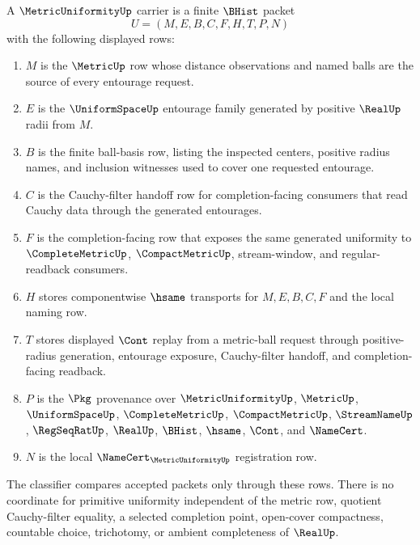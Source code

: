 \begin{definition}
\label{def:metric-uniformity-carrier}
A $\MetricUniformityUp$ carrier is a finite $\BHist$ packet
$$
U=(M,E,B,C,F,H,T,P,N)
$$
with the following displayed rows:
\begin{enumerate}
\item $M$ is the $\MetricUp$ row whose distance observations and named balls are the source of every entourage request.
\item $E$ is the $\UniformSpaceUp$ entourage family generated by positive $\RealUp$ radii from $M$.
\item $B$ is the finite ball-basis row, listing the inspected centers, positive radius names, and inclusion witnesses used to cover one requested entourage.
\item $C$ is the Cauchy-filter handoff row for completion-facing consumers that read Cauchy data through the generated entourages.
\item $F$ is the completion-facing row that exposes the same generated uniformity to $\CompleteMetricUp$, $\CompactMetricUp$, stream-window, and regular-readback consumers.
\item $H$ stores componentwise $\hsame$ transports for $M,E,B,C,F$ and the local naming row.
\item $T$ stores displayed $\Cont$ replay from a metric-ball request through positive-radius generation, entourage exposure, Cauchy-filter handoff, and completion-facing readback.
\item $P$ is the $\Pkg$ provenance over $\MetricUniformityUp$, $\MetricUp$, $\UniformSpaceUp$, $\CompleteMetricUp$, $\CompactMetricUp$, $\StreamNameUp$, $\RegSeqRatUp$, $\RealUp$, $\BHist$, $\hsame$, $\Cont$, and $\NameCert$.
\item $N$ is the local $\NameCert_{\MetricUniformityUp}$ registration row.
\end{enumerate}
The classifier compares accepted packets only through these rows. There is no coordinate for primitive uniformity independent of the metric row, quotient Cauchy-filter equality, a selected completion point, open-cover compactness, countable choice, trichotomy, or ambient completeness of $\RealUp$.
\end{definition}

